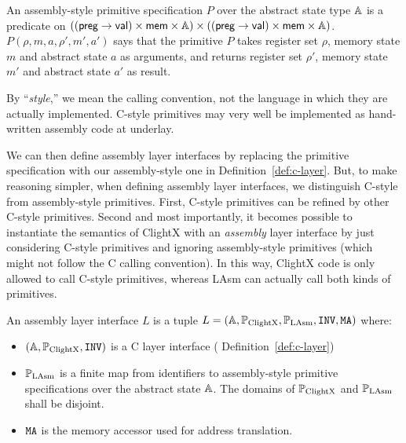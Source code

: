 \begin{definition}
An assembly-style primitive specification $P$ over the abstract state type
$\mathbb{A}$ is a predicate on $((\textsf{preg} \rightarrow \textsf{val}) \times \textsf{mem} \times \mathbb{A}) \times
((\textsf{preg} \rightarrow \textsf{val}) \times \textsf{mem} \times \mathbb{A})$. $P(\rho, m, a,
\rho', m', a')$ says that the primitive $P$ takes
register set $\rho$, memory state $m$ and abstract state $a$ as
arguments, and returns register set $\rho'$, memory state
$m'$ and abstract state $a'$ as result.
\end{definition}

By ``\emph{style},'' we mean the calling convention,
not the language in which they are actually implemented.
C-style primitives may very well be implemented as hand-written
assembly code at underlay.

We can then define assembly layer interfaces by replacing the primitive
specification with our assembly-style one in Definition~\ref{def:c-layer}.
But, to make reasoning simpler, when defining assembly layer interfaces,
we distinguish C-style from assembly-style primitives.
First, C-style primitives
can be refined by other C-style primitives. 
Second and most importantly, it
becomes possible to instantiate the semantics of ClightX with an
\emph{assembly} layer interface by just considering C-style primitives and ignoring
assembly-style primitives (which might not follow the C calling convention).
In this way, ClightX code is only allowed to call C-style
primitives, whereas LAsm can actually call both kinds of primitives.

\begin{definition} \label{def:asm-layer}
An assembly layer interface $L$ is a tuple
$ L = (\mathbb{A}, \mathbb{P}_{\mathrm{ClightX}}, \mathbb{P}_{\mathrm{LAsm}}, {\texttt{INV}}, {\texttt{MA}}) $
where:
\begin{itemize}
\item $(\mathbb{A}, \mathbb{P}_{\mathrm{ClightX}}, {\texttt{INV}})$ is a C layer interface (\cf
Definition~\ref{def:c-layer})
\item $\mathbb{P}_{\mathrm{LAsm}}$ is a finite map from identifiers to assembly-style
primitive specifications over the abstract state $\mathbb{A}$. The domains of
$\mathbb{P}_{\mathrm{ClightX}}$ and $\mathbb{P}_{\mathrm{LAsm}}$ shall be disjoint.
\item ${\texttt{MA}}$ is the memory accessor used for address translation.
\end{itemize}
\end{definition}



